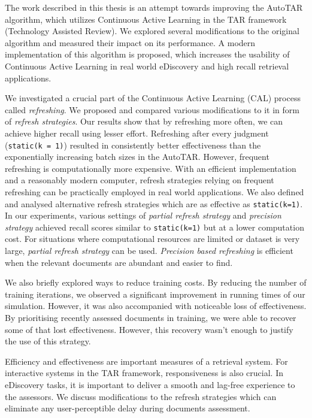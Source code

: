 \label{chap:conclusion}
The work described in this thesis is an attempt towards improving the AutoTAR
algorithm, which utilizes Continuous Active Learning in the TAR framework
(Technology Assisted Review). We explored several modifications to the original
algorithm and measured their impact on its performance. A modern implementation
of this algorithm is proposed, which increases the usability of Continuous Active
Learning in real world eDiscovery and high recall retrieval applications.

We investigated a crucial part of the Continuous Active Learning (CAL) process
called \textit{refreshing}. We proposed and compared various modifications to it
in form of \textit{refresh strategies}. Our results show that by refreshing more
often, we can achieve higher recall using lesser effort. Refreshing after every
judgment (\texttt{static(k = 1)}) resulted in consistently better effectiveness
than the exponentially increasing batch sizes in the AutoTAR. However, frequent
refreshing is computationally more expensive. With an efficient implementation
and a reasonably modern computer, refresh strategies relying on frequent
refreshing can be practically employed in real world applications.  We also
defined and analysed alternative refresh strategies which are as effective as
\texttt{static(k=1)}.  In our experiments, various settings of \textit{partial
refresh strategy} and \textit{precision strategy} achieved recall scores similar
to \texttt{static(k=1)} but at a lower computation cost. For situations where
computational resources are limited or dataset is very large, \textit{partial
refresh strategy} can be used.  \textit{Precision based refreshing} is efficient
when the relevant documents are abundant and easier to find.

We also briefly explored ways to reduce training costs. By reducing the number
of training iterations, we observed a significant improvement in running times
of our simulation. However, it was also accompanied with noticeable loss of
effectiveness. By prioritising recently assessed documents in training, we were
able to recover some of that lost effectiveness. However, this recovery wasn't
enough to justify the use of this strategy.

Efficiency and effectiveness are important measures of a retrieval system. For
interactive systems in the TAR framework, responsiveness is also crucial. In
eDiscovery tasks, it is important to deliver a smooth and lag-free experience to
the assessors. We discuss modifications to the refresh strategies which can
eliminate any user-perceptible delay during documents assessment.

